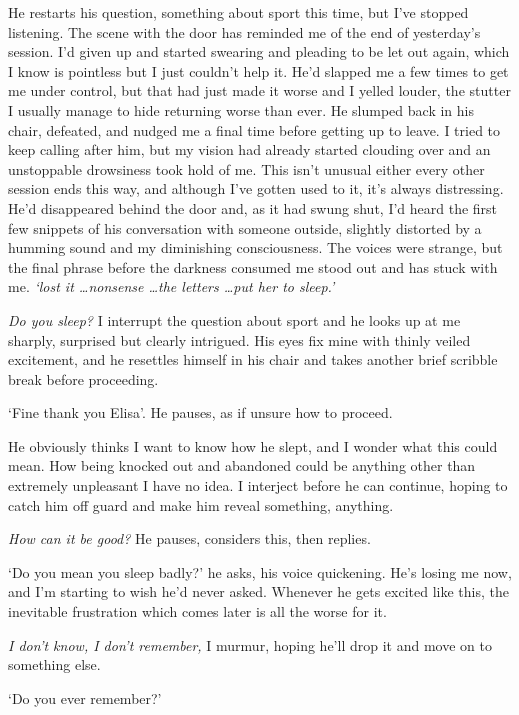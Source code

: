 He restarts his question, something about sport this time, but I've
stopped listening. The scene with the door has reminded me of the end
of yesterday's session. I'd given up and started swearing and pleading
to be let out again, which I know is pointless but I just couldn't
help it. He'd slapped me a few times to get me under control, but that
had just made it worse and I yelled louder, the stutter I usually
manage to hide returning worse than ever. He slumped back in his
chair, defeated, and nudged me a final time before getting up to
leave. I tried to keep calling after him, but my vision had already
started clouding over and an unstoppable drowsiness took hold of
me. This isn't unusual either \textemdash{} every other session ends
this way, and although I've gotten used to it, it's always
distressing. He'd disappeared behind the door and, as it had swung
shut, I'd heard the first few snippets of his conversation with
someone outside, slightly distorted by a humming sound and my
diminishing consciousness. The voices were strange, but the final
phrase before the darkness consumed me stood out and has stuck with
me. \textit{`lost it \ldots nonsense \ldots the letters \ldots put her
to sleep.'}

 \textit{Do you sleep?} I interrupt the question about sport and he
 looks up at me sharply, surprised but clearly intrigued. His eyes fix
 mine with thinly veiled excitement, and he resettles himself in his
 chair and takes another brief scribble break before proceeding.

`Fine thank you Elisa'. He pauses, as if unsure how to proceed.

He obviously thinks I want to know how he slept, and I wonder what
this could mean. How being knocked out and abandoned could be anything
other than extremely unpleasant I have no idea. I interject before he
can continue, hoping to catch him off guard and make him reveal
something, anything.

 \textit{How can it be good?} He pauses, considers this, then replies.

`Do you mean you sleep badly?' he asks, his voice quickening. He's
losing me now, and I'm starting to wish he'd never asked. Whenever he
gets excited like this, the inevitable frustration which comes later
is all the worse for it.

 \textit{I don't know, I don't remember,} I murmur, hoping he'll drop
 it and move on to something else.

`Do you ever remember?'

